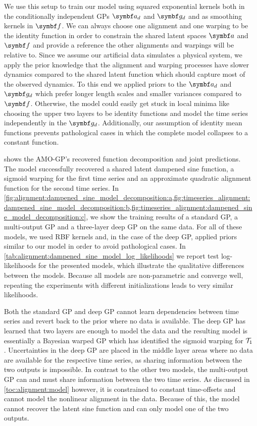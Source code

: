 We use this setup to train our model using squared exponential kernels both in the conditionally independent GPs $\rv{a_d}$ and $\rv{g_d}$ and as smoothing kernels in $\rv{f}$.
We can always choose one alignment and one warping to be the identity function in order to constrain the shared latent spaces $\rv{a}$ and $\rv{f}$ and provide a reference the other alignments and warpings will be relative to.
Since we assume our artificial data simulates a physical system, we apply the prior knowledge that the alignment and warping processes have slower dynamics compared to the shared latent function which should capture most of the observed dynamics.
To this end we applied priors to the $\rv{a_d}$ and $\rv{g_d}$ which prefer longer length scales and smaller variances compared to $\rv{f}$.
Otherwise, the model could easily get stuck in local minima like choosing the upper two layers to be identity functions and model the time series independently in the $\rv{g_d}$.
Additionally, our assumption of identity mean functions prevents pathological cases in which the complete model collapses to a constant function.

 shows the AMO-GP's recovered function decomposition and joint predictions.
The model successfully recovered a shared latent dampened sine function, a sigmoid warping for the first time series and an approximate quadratic alignment function for the second time series.
In \cref{fig:alignment:dampened_sine_model_decomposition:a,fig:timeseries_alignment:dampened_sine_model_decomposition:b,fig:timeseries_alignment:dampened_sine_model_decomposition:c}, we show the training results of a standard GP, a multi-output GP and a three-layer deep GP on the same data.
For all of these models, we used RBF kernels and, in the case of the deep GP, applied priors similar to our model in order to avoid pathological cases.
In \cref{tab:alignment:dampened_sine_model_log_likelihoods} we report test log-likelihoods for the presented models, which illustrate the qualitative differences between the models.
Because all models are non-parametric and converge well, repeating the experiments with different initializations leads to very similar likelihoods.

Both the standard GP and deep GP cannot learn dependencies between time series and revert back to the prior where no data is available.
The deep GP has learned that two layers are enough to model the data and the resulting model is essentially a Bayesian warped GP which has identified the sigmoid warping for $\mathcal{T}_1$.
Uncertainties in the deep GP are placed in the middle layer areas where no data are available for the respective time series, as sharing information between the two outputs is impossible.
In contrast to the other two models, the multi-output GP can and must share information between the two time series.
As discussed in \cref{toc:alignment:model} however, it is constrained to constant time-offsets and cannot model the nonlinear alignment in the data.
Because of this, the model cannot recover the latent sine function and can only model one of the two outputs.



